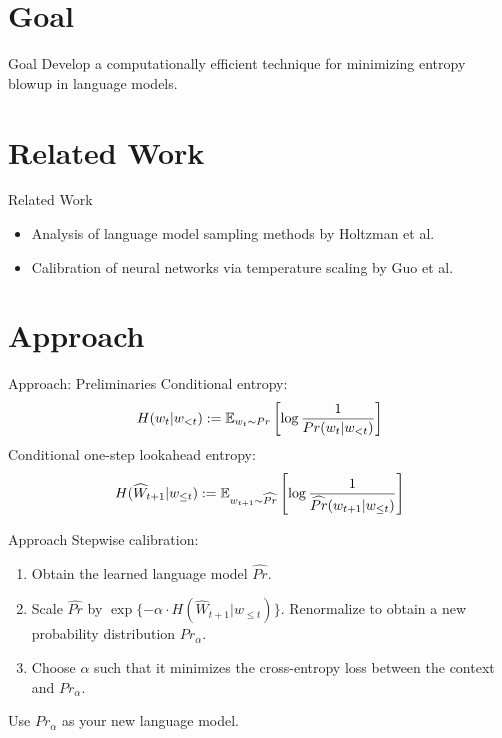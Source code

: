 \documentclass{beamer}
\begin{document}
\section{Goal}
\begin{frame}{Goal}
Develop a computationally efficient technique for minimizing entropy blowup in language models.
\end{frame}

\section{Related Work}
\begin{frame}{Related Work}
    \begin{itemize}
        \item Analysis of language model sampling methods by Holtzman et al. \cite{holtzman2019curious}
        \item Calibration of neural networks via temperature scaling by Guo et al. \cite{guo2017calibration}
    \end{itemize}
\end{frame}

\section{Approach}
\begin{frame}{Approach: Preliminaries}
Conditional entropy: 
\begin{align*}
    H(w_t|w_{<t}) := \operatorname{\mathbb{E}}_{w_t \sim Pr} \left[ \log \frac{1}{Pr(w_t|w_{<t})} \right]
\end{align*}
\pause
Conditional one-step lookahead entropy:
\begin{align*}
    H(\widehat{W}_{t+1} | w_{\leq t}) := \operatorname{\mathbb{E}}_{w_{t+1} \sim \widehat{Pr}} \left[\log \frac{1}{\widehat{Pr}(w_{t+1} | w_{\leq t} )} \right]
\end{align*}
\end{frame}

\begin{frame}{Approach}
    Stepwise calibration:
    \begin{enumerate}
        \item Obtain the learned language model $\widehat{Pr}$.
        \pause
        \item Scale $\widehat{Pr}$ by $\exp\{-\alpha \cdot H(\widehat{W}_{t+1} | w_{\leq t})\}$. Renormalize to obtain a new probability distribution $Pr_\alpha$.
        \pause
        \item Choose $\alpha$ such that it minimizes the cross-entropy loss between the context and $Pr_\alpha$.
        \pause
    \end{enumerate}
    Use $Pr_\alpha$ as your new language model.
\end{frame}
\end{document}
